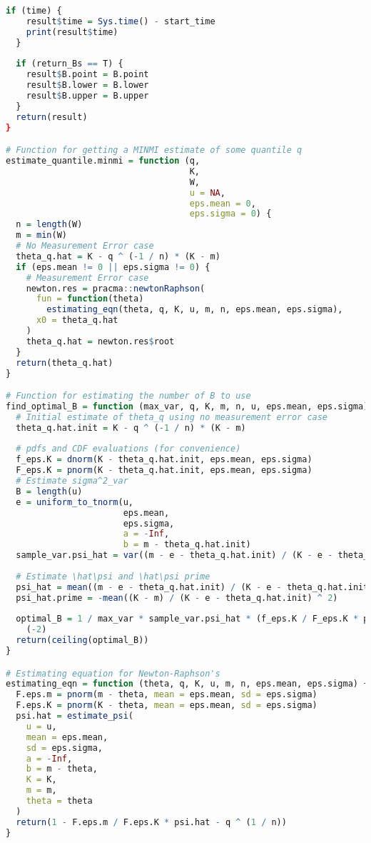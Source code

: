 \begin{lstlisting}[language=R, caption = {Functions implementing MINMI in R.}]
  if (time) {
    result$time = Sys.time() - start_time
    print(result$time)
  }
  
  if (return_Bs == T) {
    result$B.point = B.point
    result$B.lower = B.lower
    result$B.upper = B.upper
  }
  return(result)
}

# Function for getting a MINMI estimate of some quantile q
estimate_quantile.minmi = function (q,
                                    K,
                                    W,
                                    u = NA,
                                    eps.mean = 0,
                                    eps.sigma = 0) {
  n = length(W)
  m = min(W)
  # No Measurement Error case
  theta_q.hat = K - q ^ (-1 / n) * (K - m)
  if (eps.mean != 0 || eps.sigma != 0) {
    # Measurement Error case
    newton.res = pracma::newtonRaphson(
      fun = function(theta)
        estimating_eqn(theta, q, K, u, m, n, eps.mean, eps.sigma),
      x0 = theta_q.hat
    )
    theta_q.hat = newton.res$root
  }
  return(theta_q.hat)
}

# Function for estimating the number of B to use
find_optimal_B = function (max_var, q, K, m, n, u, eps.mean, eps.sigma) {
  # Initial estimate of theta_q using no measurement error case
  theta_q.hat.init = K - q ^ (-1 / n) * (K - m)
  
  # pdfs and CDF evaluations (for convenience)
  f_eps.K = dnorm(K - theta_q.hat.init, eps.mean, eps.sigma)
  F_eps.K = pnorm(K - theta_q.hat.init, eps.mean, eps.sigma)
  # Estimate sigma^2_var
  B = length(u)
  e = uniform_to_tnorm(u,
                       eps.mean,
                       eps.sigma,
                       a = -Inf,
                       b = m - theta_q.hat.init)
  sample_var.psi_hat = var((m - e - theta_q.hat.init) / (K - e - theta_q.hat.init))
  
  # Estimate \hat\psi and \hat\psi prime
  psi_hat = mean((m - e - theta_q.hat.init) / (K - e - theta_q.hat.init))
  psi_hat.prime = -mean((K - m) / (K - e - theta_q.hat.init) ^ 2)
  
  optimal_B = 1 / max_var * sample_var.psi_hat * (f_eps.K / F_eps.K * psi_hat + psi_hat.prime) ^
    (-2)
  return(ceiling(optimal_B))
}

# Estimating equation for Newton-Raphson's
estimating_eqn = function (theta, q, K, u, m, n, eps.mean, eps.sigma) {
  F.eps.m = pnorm(m - theta, mean = eps.mean, sd = eps.sigma)
  F.eps.K = pnorm(K - theta, mean = eps.mean, sd = eps.sigma)
  psi.hat = estimate_psi(
    u = u,
    mean = eps.mean,
    sd = eps.sigma,
    a = -Inf,
    b = m - theta,
    K = K,
    m = m,
    theta = theta
  )
  return(1 - F.eps.m / F.eps.K * psi.hat - q ^ (1 / n))
}


\end{lstlisting}
